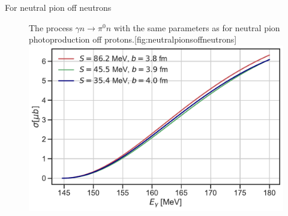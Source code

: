 For neutral pion off neutrons
\begin{figure}[H]
    \begin{sidecaption}{The process $\gamma n \rightarrow \pi^0 n$ with the same parameters as for neutral pion photoproduction off protons.}[fig:neutralpionsoffneutrons]
    \includegraphics[width=\linewidth]{Figures/NeutralPionsOffNeutrons.pdf}
    \end{sidecaption}
\end{figure}

